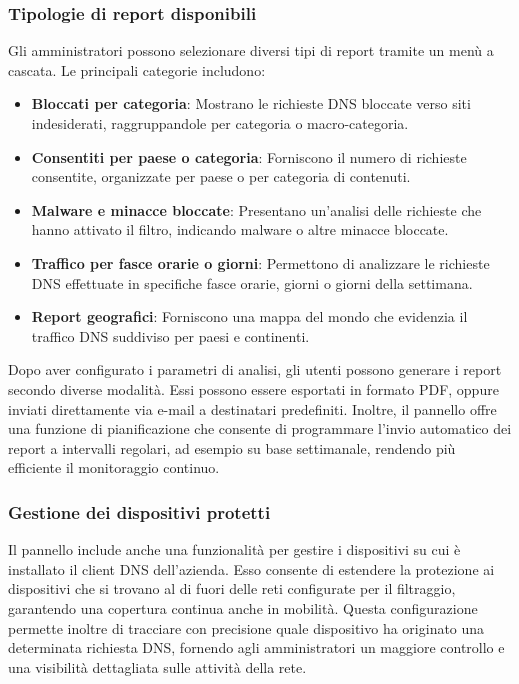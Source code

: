 \subsubsection{Tipologie di report disponibili}
Gli amministratori possono selezionare diversi tipi di report tramite un menù a cascata. Le principali categorie includono:
\begin{itemize}
  \item \textbf{Bloccati per categoria}: Mostrano le richieste DNS bloccate verso siti indesiderati, raggruppandole per categoria o macro-categoria.
  \item \textbf{Consentiti per paese o categoria}: Forniscono il numero di richieste consentite, organizzate per paese o per categoria di contenuti.
  \item \textbf{Malware e minacce bloccate}: Presentano un’analisi delle richieste che hanno attivato il filtro, indicando malware o altre minacce bloccate.
  \item \textbf{Traffico per fasce orarie o giorni}: Permettono di analizzare le richieste DNS effettuate in specifiche fasce orarie, giorni o giorni della settimana.
  \item \textbf{Report geografici}: Forniscono una mappa del mondo che evidenzia il traffico DNS suddiviso per paesi e continenti.
\end{itemize}

Dopo aver configurato i parametri di analisi, gli utenti possono generare i report secondo diverse modalità. Essi possono essere esportati in formato PDF, oppure inviati direttamente via e-mail a destinatari predefiniti. Inoltre, il pannello offre una funzione di pianificazione che consente di programmare l'invio automatico dei report a intervalli regolari, ad esempio su base settimanale, rendendo più efficiente il monitoraggio continuo.

\subsubsection{Gestione dei dispositivi protetti}
Il pannello include anche una funzionalità per gestire i dispositivi su cui è installato il client DNS dell'azienda. Esso consente di estendere la protezione ai dispositivi che si trovano al di fuori delle reti configurate per il filtraggio, garantendo una copertura continua anche in mobilità. Questa configurazione permette inoltre di tracciare con precisione quale dispositivo ha originato una determinata richiesta DNS, fornendo agli amministratori un maggiore controllo e una visibilità dettagliata sulle attività della rete.

